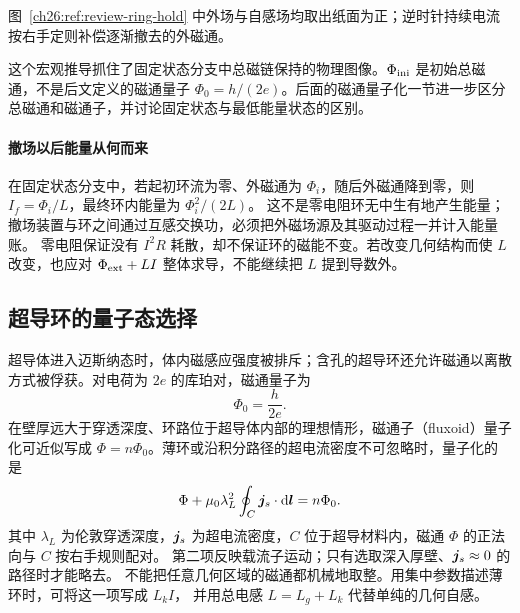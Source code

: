 {图~\ref{ch26:ref:review-ring-hold} 中外场与自感场均取出纸面为正；逆时针持续电流按右手定则补偿逐渐撤去的外磁通。

\superconductingRingDiagram

这个宏观推导抓住了固定状态分支中总磁链保持的物理图像。$\Phi_{\rm ini}$ 是初始总磁通，不是后文定义的磁通量子 $\Phi_0=h/(2e)$。后面的磁通量子化一节进一步区分总磁通和磁通子，并讨论固定状态与最低能量状态的区别。

\paragraph{撤场以后能量从何而来}
在固定状态分支中，若起初环流为零、外磁通为 $\Phi_i$，随后外磁通降到零，则
$I_f=\Phi_i/L$，最终环内能量为 $\Phi_i^2/(2L)$。
这不是零电阻环无中生有地产生能量；撤场装置与环之间通过互感交换功，必须把外磁场源及其驱动过程一并计入能量账。
零电阻保证没有 $I^2R$ 耗散，却不保证环的磁能不变。若改变几何结构而使 $L$ 改变，也应对 $\Phi_{\rm ext}+LI$ 整体求导，不能继续把 $L$ 提到导数外。



\subsection{超导环的量子态选择}


超导体进入迈斯纳态时，体内磁感应强度被排斥；含孔的超导环还允许磁通以离散方式被俘获。对电荷为 $2e$ 的库珀对，磁通量子为
\begin{equation}
 \Phi_0=\frac{h}{2e}.
\end{equation}
在壁厚远大于穿透深度、环路位于超导体内部的理想情形，磁通子（fluxoid）量子化可近似写成
$\Phi=n\Phi_0$。薄环或沿积分路径的超电流密度不可忽略时，量子化的是
\begin{equation}
 \Phi+\mu_0\lambda_L^2\oint_C\bm{j}_s\cdot\mathop{}\!\mathrm d\bm{l}=n\Phi_0.
\end{equation}
其中 $\lambda_L$ 为伦敦穿透深度，$\bm{j}_s$ 为超电流密度，$C$ 位于超导材料内，磁通 $\Phi$ 的正法向与 $C$ 按右手规则配对。
第二项反映载流子运动；只有选取深入厚壁、$\bm{j}_s\approx0$ 的路径时才能略去。
不能把任意几何区域的磁通都机械地取整。用集中参数描述薄环时，可将这一项写成 $L_kI$，
并用总电感 $L=L_g+L_k$ 代替单纯的几何自感。

}
